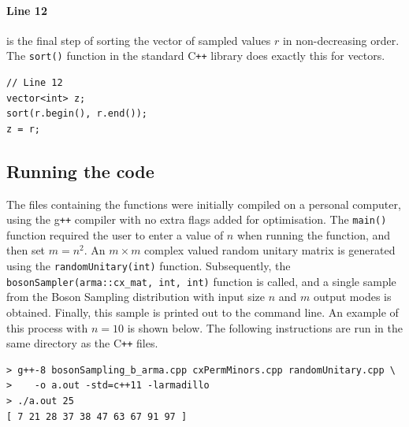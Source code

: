 \documentclass[11pt]{article}
\theoremstyle{theorem}
\theoremstyle{remark}
\theoremstyle{plain}
\theoremstyle{definition}
\begin{document}
\paragraph{Line 12} is the final step of sorting the vector of sampled values $r$ in non-decreasing order. The \texttt{sort()} function in the standard C\texttt{++} library does exactly this for vectors.
\begin{verbatim}
// Line 12
vector<int> z;
sort(r.begin(), r.end());
z = r;
\end{verbatim}

\subsection{Running the code}
The files containing the functions were initially compiled on a personal computer, using the g\texttt{++} compiler with no extra flags added for optimisation. The \texttt{main()} function required the user to enter a value of $n$ when running the function, and then set $m = n^2$. An $m \times m$ complex valued random unitary matrix is generated using the \texttt{randomUnitary(int)} function. Subsequently, the \texttt{bosonSampler(arma::cx_mat, int, int)} function is called, and a single sample from the Boson Sampling distribution with input size $n$ and $m$ output modes is obtained. Finally, this sample is printed out to the command line. An example of this process with $n = 10$ is shown below. The following instructions are run in the same directory as the C\texttt{++} files.
\begin{verbatim}
> g++-8 bosonSampling_b_arma.cpp cxPermMinors.cpp randomUnitary.cpp \
>	 -o a.out -std=c++11 -larmadillo
> ./a.out 25
[ 7 21 28 37 38 47 63 67 91 97 ]
\end{verbatim}
\end{document}
